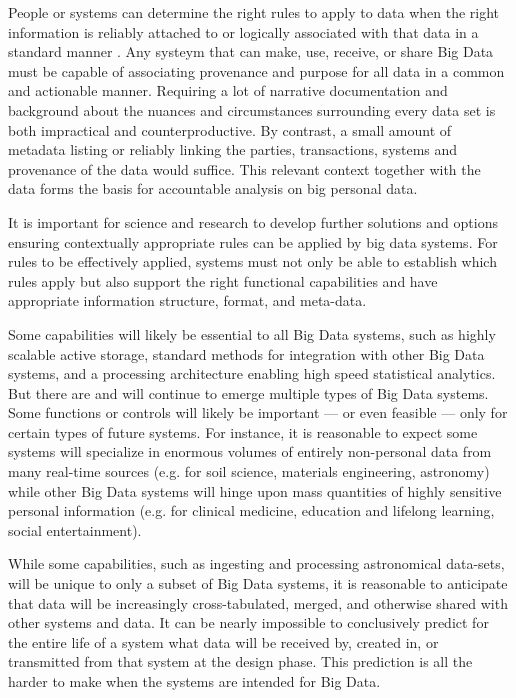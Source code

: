 People or systems can determine the right rules to apply to data when the right information is reliably attached to or logically associated with that data in a standard manner .
Any systeym that can make, use, receive, or share Big Data must be capable of associating provenance and purpose for all data in a common and actionable manner.
Requiring a lot of narrative documentation and background about the nuances and circumstances surrounding every data set is both impractical and counterproductive.
By contrast, a small amount of metadata listing or reliably linking the parties, transactions, systems and provenance of the data would suffice.
This relevant context together with the data forms the basis for accountable analysis on big personal data.

It is important for science and research to develop further solutions and options ensuring contextually appropriate rules can be applied by big data systems.
For rules to be effectively applied, systems must not only be able to establish which rules apply but also support the right functional capabilities and have appropriate information structure, format, and meta-data.

Some capabilities will likely be essential to all Big Data systems, such as highly scalable active storage, standard methods for integration with other Big Data systems, and a processing architecture enabling high speed statistical analytics.
But there are and will continue to emerge multiple types of Big Data systems.
Some functions or controls will likely be important --- or even feasible --- only for certain types of future systems.
For instance, it is reasonable to expect some systems will specialize in enormous volumes of entirely non-personal data from many real-time sources (e.g. for soil science, materials engineering, astronomy) while other Big Data systems will hinge upon mass quantities of highly sensitive personal information (e.g. for clinical medicine, education and lifelong learning, social entertainment).


While some capabilities, such as ingesting and processing astronomical data-sets, will be unique to only a subset of Big Data systems, it is reasonable to anticipate that data will be increasingly cross-tabulated, merged, and otherwise shared with other systems and data.
It can be nearly impossible to conclusively predict for the entire life of a system what data will be received by, created in, or transmitted from that system at the design phase.
This prediction is all the harder to make when the systems are intended for Big Data.

